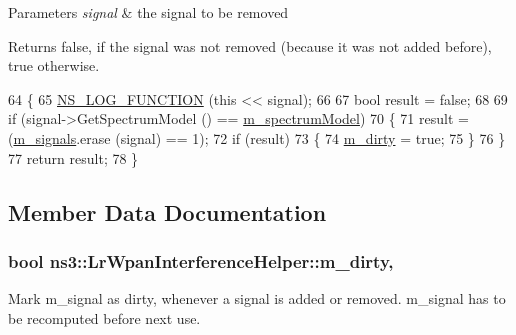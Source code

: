 \begin{DoxyParams}{Parameters}
{\em signal} & the signal to be removed \\
\hline
\end{DoxyParams}
\begin{DoxyReturn}{Returns}
false, if the signal was not removed (because it was not added before), true otherwise. 
\end{DoxyReturn}

\begin{DoxyCode}
64 \{
65   \hyperlink{log-macros-disabled_8h_a90b90d5bad1f39cb1b64923ea94c0761}{NS\_LOG\_FUNCTION} (\textcolor{keyword}{this} << signal);
66 
67   \textcolor{keywordtype}{bool} result = \textcolor{keyword}{false};
68 
69   \textcolor{keywordflow}{if} (signal->GetSpectrumModel () == \hyperlink{classns3_1_1LrWpanInterferenceHelper_a51e9ff732295b1df034bf296864aab38}{m\_spectrumModel})
70     \{
71       result = (\hyperlink{classns3_1_1LrWpanInterferenceHelper_a441d09e63473eea61046bb0bb24e3bc7}{m\_signals}.erase (signal) == 1);
72       \textcolor{keywordflow}{if} (result)
73         \{
74           \hyperlink{classns3_1_1LrWpanInterferenceHelper_a8e43b6bfc909ceab15c2ad42afafe324}{m\_dirty} = \textcolor{keyword}{true};
75         \}
76     \}
77   \textcolor{keywordflow}{return} result;
78 \}
\end{DoxyCode}


\subsection{Member Data Documentation}
\subsubsection[{\texorpdfstring{m\+\_\+dirty}{m_dirty}}]{\setlength{\rightskip}{0pt plus 5cm}bool ns3\+::\+Lr\+Wpan\+Interference\+Helper\+::m\+\_\+dirty\hspace{0.3cm}{\ttfamily [mutable]}, {\ttfamily [private]}}\hypertarget{classns3_1_1LrWpanInterferenceHelper_a8e43b6bfc909ceab15c2ad42afafe324}{}\label{classns3_1_1LrWpanInterferenceHelper_a8e43b6bfc909ceab15c2ad42afafe324}
Mark m\+\_\+signal as dirty, whenever a signal is added or removed. m\+\_\+signal has to be recomputed before next use. 
